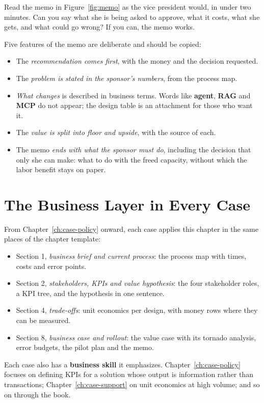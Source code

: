 \begin{tryit}
Read the memo in Figure~\ref{fig:memo} as the vice president would, in under two minutes. Can you say what she is being asked to approve, what it costs, what she gets, and what could go wrong? If you can, the memo works.
\end{tryit}

Five features of the memo are deliberate and should be copied:
\begin{itemize}[itemsep=1pt]
  \item The \emph{recommendation comes first}, with the money and the decision requested.
  \item The \emph{problem is stated in the sponsor's numbers}, from the process map.
  \item \emph{What changes} is described in business terms. Words like \textbf{agent}, \textbf{RAG} and \textbf{MCP} do not appear; the design table is an attachment for those who want it.
  \item The \emph{value is split into floor and upside}, with the source of each.
  \item The memo \emph{ends with what the sponsor must do}, including the decision that only she can make: what to do with the freed capacity, without which the labor benefit stays on paper.
\end{itemize}

\section{The Business Layer in Every Case}
\label{sec:business-in-cases}

From Chapter~\ref{ch:case-policy} onward, each case applies this chapter in the same places of the chapter template:
\begin{itemize}[itemsep=1pt]
  \item Section 1, \emph{business brief and current process}: the process map with times, costs and error points.
  \item Section 2, \emph{stakeholders, KPIs and value hypothesis}: the four stakeholder roles, a KPI tree, and the hypothesis in one sentence.
  \item Section 4, \emph{trade-offs}: unit economics per design, with money rows where they can be measured.
  \item Section 8, \emph{business case and rollout}: the value case with its tornado analysis, error budgets, the pilot plan and the memo.
\end{itemize}
Each case also has a \textbf{business skill} it emphasizes. Chapter~\ref{ch:case-policy} focuses on defining KPIs for a solution whose output is information rather than transactions; Chapter~\ref{ch:case-support} on unit economics at high volume; and so on through the book.

